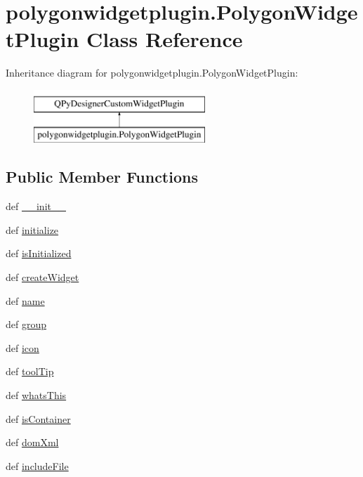\hypertarget{classpolygonwidgetplugin_1_1PolygonWidgetPlugin}{}\section{polygonwidgetplugin.\+Polygon\+Widget\+Plugin Class Reference}
\label{classpolygonwidgetplugin_1_1PolygonWidgetPlugin}
Inheritance diagram for polygonwidgetplugin.\+Polygon\+Widget\+Plugin\+:\begin{figure}[H]
\begin{center}
\leavevmode
\includegraphics[height=2.000000cm]{classpolygonwidgetplugin_1_1PolygonWidgetPlugin}
\end{center}
\end{figure}
\subsection*{Public Member Functions}
\begin{DoxyCompactItemize}
\item 
def \hyperlink{classpolygonwidgetplugin_1_1PolygonWidgetPlugin_a5e1ae3aa9154f1fdd51a016779a3029c}{\+\_\+\+\_\+init\+\_\+\+\_\+}
\item 
def \hyperlink{classpolygonwidgetplugin_1_1PolygonWidgetPlugin_addb8098c476ee1fb75282a03da0abee4}{initialize}
\item 
def \hyperlink{classpolygonwidgetplugin_1_1PolygonWidgetPlugin_a9bb5d2f47742a6d431fdf007023fff44}{is\+Initialized}
\item 
def \hyperlink{classpolygonwidgetplugin_1_1PolygonWidgetPlugin_abcb99ad284cfa0480d0db2be7985e015}{create\+Widget}
\item 
def \hyperlink{classpolygonwidgetplugin_1_1PolygonWidgetPlugin_ac1c4dfe515d5157f85158f8cdd498020}{name}
\item 
def \hyperlink{classpolygonwidgetplugin_1_1PolygonWidgetPlugin_ad6a407bbdb847d84703d65cc5becf486}{group}
\item 
def \hyperlink{classpolygonwidgetplugin_1_1PolygonWidgetPlugin_a0f1cf52c736ffae5fd930766c75bd6ca}{icon}
\item 
def \hyperlink{classpolygonwidgetplugin_1_1PolygonWidgetPlugin_ae87b54ea98d84c25aafd662e058f64d4}{tool\+Tip}
\item 
def \hyperlink{classpolygonwidgetplugin_1_1PolygonWidgetPlugin_adb422b44a7fe0fe93e532df63d605f3e}{whats\+This}
\item 
def \hyperlink{classpolygonwidgetplugin_1_1PolygonWidgetPlugin_a76f3123f69d698125669d74d40dc2954}{is\+Container}
\item 
def \hyperlink{classpolygonwidgetplugin_1_1PolygonWidgetPlugin_a0bfcdd77890efd07938354b4db9a3d48}{dom\+Xml}
\item 
def \hyperlink{classpolygonwidgetplugin_1_1PolygonWidgetPlugin_aea4fd04d34006faa83c5c0df8c85192a}{include\+File}
\end{DoxyCompactItemize}

